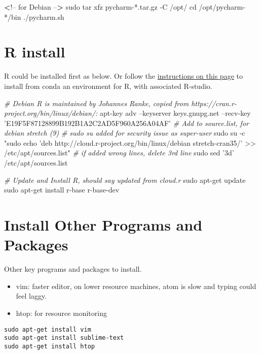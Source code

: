 \documentclass[]{article}
\newenvironment{Shaded}{\begin{snugshade}}{\end{snugshade}}
\newcommand{\BuiltInTok}[1]{#1}
\newcommand{\CommentTok}[1]{\textcolor[rgb]{0.56,0.35,0.01}{\textit{#1}}}
\newcommand{\ExtensionTok}[1]{#1}
\newcommand{\FunctionTok}[1]{\textcolor[rgb]{0.00,0.00,0.00}{#1}}
\newcommand{\NormalTok}[1]{#1}
\newcommand{\OperatorTok}[1]{\textcolor[rgb]{0.81,0.36,0.00}{\textbf{#1}}}
\newcommand{\StringTok}[1]{\textcolor[rgb]{0.31,0.60,0.02}{#1}}
\providecommand{\tightlist}{%
  \setlength{\itemsep}{0pt}\setlength{\parskip}{0pt}}
\begin{document}
\begin{Shaded}
\begin{Highlighting}[]
\OperatorTok{<}\NormalTok{!}\ExtensionTok{--}\NormalTok{ for Debian --}\OperatorTok{>}
\FunctionTok{sudo}\NormalTok{ tar xfz pycharm-*.tar.gz -C /opt/}
\BuiltInTok{cd}\NormalTok{ /opt/pycharm-*/bin}
\ExtensionTok{./pycharm.sh}
\end{Highlighting}
\end{Shaded}

\hypertarget{r-install}{%
\section{R install}\label{r-install}}

R could be installed first as below. Or follow the
\href{https://fanwangecon.github.io/Tex4Econ/nontex/install/windows/fn_installations.html}{instructions
on this page} to install from conda an environment for R, with
associated R-studio.

\begin{Shaded}
\begin{Highlighting}[]
\CommentTok{# Debian R is maintained by Johannes Ranke, copied from https://cran.r-project.org/bin/linux/debian/:}
\ExtensionTok{apt-key}\NormalTok{ adv --keyserver keys.gnupg.net --recv-key }\StringTok{'E19F5F87128899B192B1A2C2AD5F960A256A04AF'}
\CommentTok{# Add to source.list, for debian stretch (9)}
\CommentTok{# sudo su added for security issue as super-user}
\FunctionTok{sudo}\NormalTok{ su -c }\StringTok{"sudo echo 'deb http://cloud.r-project.org/bin/linux/debian stretch-cran35/' >> /etc/apt/sources.list"}
\CommentTok{# if added wrong lines, delete 3rd line}
\FunctionTok{sudo}\NormalTok{ sed }\StringTok{'3d'}\NormalTok{ /etc/apt/sources.list}

\CommentTok{# Update and Install R, should say updated from cloud.r}
\FunctionTok{sudo}\NormalTok{ apt-get update}
\FunctionTok{sudo}\NormalTok{ apt-get install r-base r-base-dev}
\end{Highlighting}
\end{Shaded}

\hypertarget{install-other-programs-and-packages}{%
\section{Install Other Programs and
Packages}\label{install-other-programs-and-packages}}

Other key programs and packages to install.

\begin{itemize}
\tightlist
\item
  vim: faster editor, on lower resource machines, atom is slow and
  typing could feel laggy.
\item
  htop: for resource monitoring
\end{itemize}

\begin{verbatim}
sudo apt-get install vim
sudo apt-get install sublime-text
sudo apt-get install htop
\end{verbatim}
\end{document}
